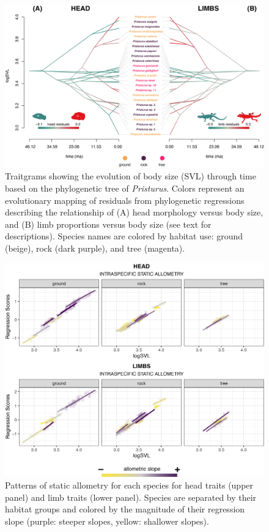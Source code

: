 \documentclass[
  11pt,
]{article}
\begin{document}
\begin{figure}

{\centering \includegraphics[width=1\linewidth]{Figs/figure_3_Pristurus_allometry_traitgram_legends} 

}

\caption{Traitgrams showing the evolution of body size (SVL) through time based on the phylogenetic tree of \textit{Pristurus}. Colors represent an evolutionary mapping of residuals from phylogenetic regressions describing the relationship of (A) head morphology versus body size, and (B) limb proportions versus body size (see text for descriptions). Species names are colored by habitat use: ground (beige), rock (dark purple), and tree (magenta).}\label{fig:unnamed-chunk-6}
\end{figure}

\newpage

\begin{figure}

{\centering \includegraphics[width=1\linewidth]{Figs/figure_4_static_allometry_v3} 

}

\caption{Patterns of static allometry for each species for head traits (upper panel) and limb traits (lower panel). Species are separated by their habitat groups and colored by the magnitude of their regression slope (purple: steeper slopes, yellow: shallower slopes).}\label{fig:unnamed-chunk-7}
\end{figure}
\end{document}
